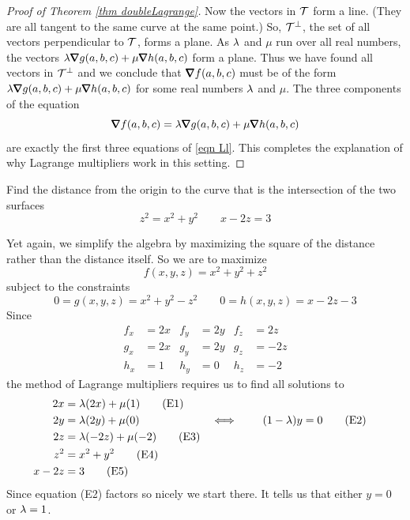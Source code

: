 \begin{proof}[Proof of Theorem \ref{thm doubleLagrange}]
Now the vectors in $\mathcal{T}$ form a line. (They are all tangent to the same 
curve at the same point.) So, $\mathcal{T}^\perp$, the set of all vectors 
perpendicular to $\mathcal{T}$,  forms a plane. As $\lambda$ and $\mu$ run over all 
real numbers, the vectors $\la\vnabla g(a,b,c)
+\mu\vnabla h(a,b,c)$  form a plane. Thus we have found all vectors
in $\mathcal{T}^\perp$ and we conclude that $\vnabla f(a,b,c)$ must be
of the form $\la\vnabla g(a,b,c)+\mu\vnabla h(a,b,c)$ 
for some real numbers $\lambda$ and $\mu$. The three components of the
equation
$$
\vnabla f(a,b,c)
=\la\vnabla g(a,b,c)+\mu\vnabla h(a,b,c)
$$
are exactly the first three equations of \eqref{eqn Ll}. This completes the
explanation of why Lagrange multipliers work in this setting.
\end{proof}


\begin{eg}\label{eg double Lagrange}
Find the distance from the origin to the curve that is the intersection
of the two surfaces
\begin{equation*}
z^2=x^2+y^2\qquad x-2z=3
\end{equation*}

\soln 
Yet again, we simplify the algebra by maximizing the square 
of the distance rather than the distance itself. So we are to maximize 
\begin{equation*}
f(x,y,z)=x^2+y^2+z^2
\end{equation*}
subject to the constraints
\begin{equation*}
0=g(x,y,z)=x^2+y^2-z^2\qquad
0=h(x,y,z)=x-2z-3
\end{equation*}
Since
\begin{align*}
f_x&=2x &  f_y&=2y  & f_z&=2z \\
g_x&=2x &  g_y&=2y  & g_z&=-2z \\
h_x&=1  &  h_y&=0   & h_z&=-2 
\end{align*}
the method of Lagrange multipliers requires us to find all solutions to
\begin{alignat*}{3}
2x&=\lambda(2x) + \mu(1)  \tag{E1} \\
2y&=\lambda(2y) + \mu(0) \qquad&\iff\qquad(1-\lambda)y&=0 \tag{E2} \\
2z&=\lambda(-2z) + \mu(-2)  \tag{E3} \\
z^2&=x^2+y^2 \tag{E4} \\
x-2z&=3 \tag{E5}
\end{alignat*}
Since equation (E2) factors so nicely we start there.
It tells us that either $y=0$ or $\lambda=1$.


\end{eg}
